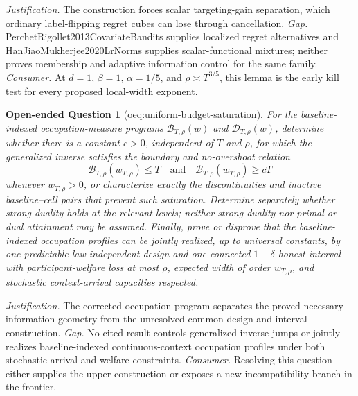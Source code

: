 \documentclass{article}
\newtheorem{openendedquestion}{Open-ended Question}
\begin{document}
\par\smallskip\noindent \textit{Justification.} The construction forces scalar targeting-gain separation, which ordinary label-flipping regret cubes can lose through cancellation. \textit{Gap.} PerchetRigollet2013CovariateBandits supplies localized regret alternatives and HanJiaoMukherjee2020LrNorms supplies scalar-functional mixtures; neither proves membership and adaptive information control for the same family. \textit{Consumer.} At \(d=1\), \(\beta=1\), \(\alpha=1/5\), and \(\rho\asymp T^{3/5}\), this lemma is the early kill test for every proposed local-width exponent.

\begin{openendedquestion}[oeq:uniform-budget-saturation]\label{oeq:uniform-budget-saturation}
For the baseline-indexed occupation-measure programs \(\mathcal B_{T,\rho}(w)\) and \(\mathcal D_{T,\rho}(w)\), determine whether there is a constant \(c>0\), independent of \(T\) and \(\rho\), for which the generalized inverse satisfies the boundary and no-overshoot relation
\[
\mathcal B_{T,\rho}(w_{T,\rho})\le T
\quad\text{and}\quad
\mathcal B_{T,\rho}(w_{T,\rho})\ge cT
\]
whenever \(w_{T,\rho}>0\), or characterize exactly the discontinuities and inactive baseline--cell pairs that prevent such saturation.  Determine separately whether strong duality holds at the relevant levels; neither strong duality nor primal or dual attainment may be assumed.  Finally, prove or disprove that the baseline-indexed occupation profiles can be jointly realized, up to universal constants, by one predictable law-independent design and one connected \(1-\delta\) honest interval with participant-welfare loss at most \(\rho\), expected width of order \(w_{T,\rho}\), and stochastic context-arrival capacities respected.
\end{openendedquestion}
\par\smallskip\noindent \textit{Justification.} The corrected occupation program separates the proved necessary information geometry from the unresolved common-design and interval construction. \textit{Gap.} No cited result controls generalized-inverse jumps or jointly realizes baseline-indexed continuous-context occupation profiles under both stochastic arrival and welfare constraints. \textit{Consumer.} Resolving this question either supplies the upper construction or exposes a new incompatibility branch in the frontier.
\end{document}
